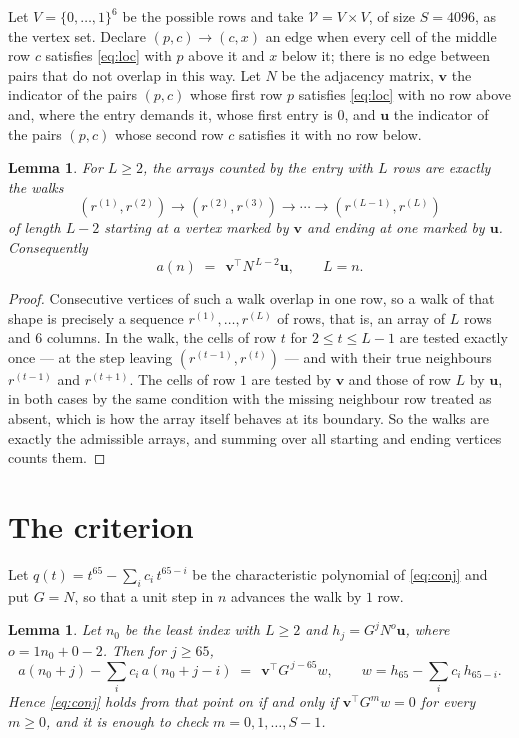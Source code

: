 \documentclass[11pt,a4paper]{article}
\theoremstyle{plain}
\newtheorem{lemma}[theorem]{Lemma}
\theoremstyle{definition}
\begin{document}
Let $V=\{0,\dots,1\}^{6}$ be the possible rows and take
$\mathcal V=V\times V$, of size $S=4096$, as the vertex set. Declare $(p,c)\to(c,x)$ an edge
when every cell of the middle row $c$ satisfies \eqref{eq:loc} with $p$ above it and $x$
below it; there is no edge between pairs that do not overlap in this way. Let $N$ be the
adjacency matrix, $\mathbf{v}$ the indicator of the pairs $(p,c)$ whose first row $p$
satisfies \eqref{eq:loc} with no row above and, where the entry demands it, whose first entry is $0$, and $\mathbf{u}$ the indicator of
the pairs $(p,c)$ whose second row $c$ satisfies it with no row below.

\begin{lemma}\label{lem:walk}
For $L\ge2$, the arrays counted by the entry with $L$ rows are exactly the walks
\[
(r^{(1)},r^{(2)})\to(r^{(2)},r^{(3)})\to\cdots\to(r^{(L-1)},r^{(L)})
\]
of length $L-2$ starting at a vertex marked by $\mathbf{v}$ and ending at one marked by
$\mathbf{u}$. Consequently
\[
a(n)\;=\;\,\mathbf{v}^{\!\top}N^{\,L-2}\mathbf{u},\qquad L=n .
\]
\end{lemma}

\begin{proof}
Consecutive vertices of such a walk overlap in one row, so a walk of that shape is
precisely a sequence $r^{(1)},\dots,r^{(L)}$ of rows, that is, an array of $L$ rows
and $6$ columns. In the walk, the cells of row $t$ for $2\le t\le L-1$ are tested
exactly once --- at the step leaving $(r^{(t-1)},r^{(t)})$ --- and with their true
neighbours $r^{(t-1)}$ and $r^{(t+1)}$. The cells of row $1$ are tested by
$\mathbf{v}$ and those of row $L$ by $\mathbf{u}$, in both cases by the same condition
with the missing neighbour row treated as absent, which is how the array itself behaves at
its boundary. So the walks are exactly the admissible arrays, and summing over all starting
and ending vertices counts them.
\end{proof}

\section{The criterion}

Let $q(t)=t^{65}-\sum_i c_i\,t^{65-i}$ be the characteristic polynomial of
\eqref{eq:conj} and put $G=N$, so that a unit step in $n$ advances the walk by
$1$ row.

\begin{lemma}\label{lem:crit}
Let $n_0$ be the least index with $L\ge2$ and $h_j=G^{j}N^{o}\mathbf{u}$, where
$o=1n_0+0-2$. Then for $j\ge65$,
\[
a(n_0+j)-\sum_i c_i\,a(n_0+j-i)\;=\;\,\mathbf{v}^{\!\top}G^{\,j-65}w,
\qquad w=h_{65}-\sum_i c_i\,h_{65-i} .
\]
Hence \eqref{eq:conj} holds from that point on if and only if
$\mathbf{v}^{\!\top}G^{m}w=0$ for every $m\ge0$, and it is enough to check
$m=0,1,\dots,S-1$.
\end{lemma}
\end{document}
